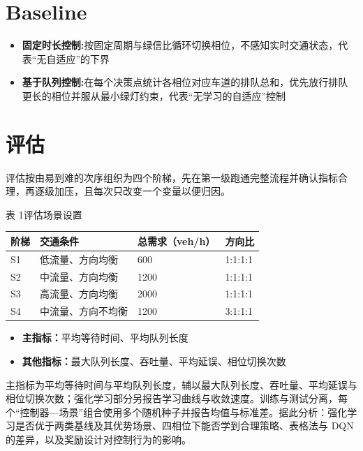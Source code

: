 \documentclass[heading=true]{ctexart}
\begin{document}
\section{Baseline}
\begin{itemize}
    \item \textbf{固定时长控制:}按固定周期与绿信比循环切换相位，不感知实时交通状态，代表“无自适应”的下界
    \item \textbf{基于队列控制:}在每个决策点统计各相位对应车道的排队总和，优先放行排队更长的相位并服从最小绿灯约束，代表“无学习的自适应”控制
\end{itemize}

\section{评估}

评估按由易到难的次序组织为四个阶梯，先在第一级跑通完整流程并确认指标合理，再逐级加压，且每次只改变一个变量以便归因。

\begin{center}\small
表 1\quad 评估场景设置\\[2pt]
\begin{tabular}{@{}llll@{}}
  \toprule
  阶梯 & 交通条件 & 总需求（veh/h） & 方向比 \\
  \midrule
  S1 & 低流量、方向均衡 & 600  & 1:1:1:1 \\
  S2 & 中流量、方向均衡 & 1200 & 1:1:1:1 \\
  S3 & 高流量、方向均衡 & 2000 & 1:1:1:1 \\
  S4 & 中流量、方向不均衡 & 1200 & 3:1:1:1 \\
  \bottomrule
\end{tabular}
\end{center}
\begin{itemize}
    \item \textbf{主指标：}平均等待时间、平均队列长度
    \item \textbf{其他指标：}最大队列长度、吞吐量、平均延误、相位切换次数
\end{itemize}
主指标为平均等待时间与平均队列长度，辅以最大队列长度、吞吐量、平均延误与相位切换次数；强化学习部分另报告学习曲线与收敛速度。训练与测试分离，每个“控制器—场景”组合使用多个随机种子并报告均值与标准差。据此分析：强化学习是否优于两类基线及其优势场景、四相位下能否学到合理策略、表格法与 DQN 的差异，以及奖励设计对控制行为的影响。
\end{document}
